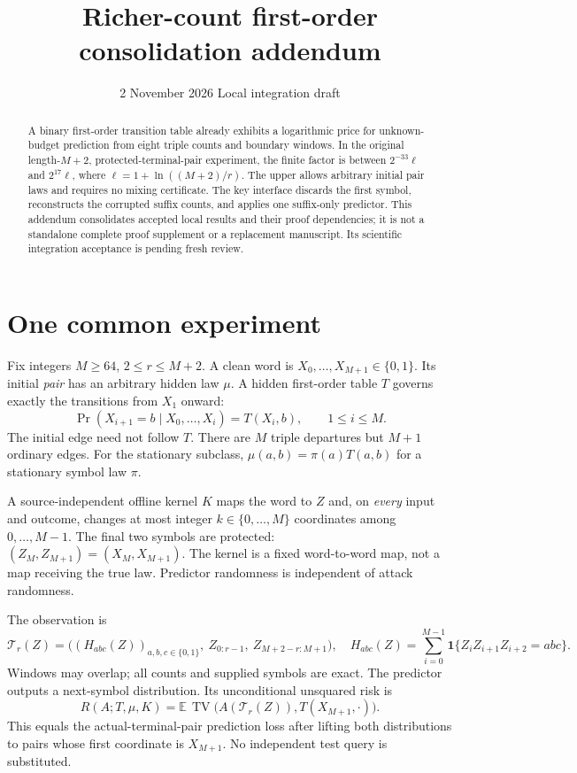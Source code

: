 \documentclass[10pt]{article}
\title{Richer-count first-order consolidation addendum}
\author{}
\date{2 November 2026 \quad Local integration draft}
\newcommand{\TV}{\operatorname{TV}}
\newcommand{\E}{\mathbb E}
\newcommand{\ind}{\mathbf1}
\begin{document}
\maketitle
\vspace{-1.3em}
\begin{abstract}
A binary first-order transition table already exhibits a logarithmic price for unknown-budget prediction from eight triple counts and boundary windows. In the original length-$M+2$, protected-terminal-pair experiment, the finite factor is between $2^{-33}\ell$ and $2^{17}\ell$, where $\ell=1+\ln((M+2)/r)$. The upper allows arbitrary initial pair laws and requires no mixing certificate. The key interface discards the first symbol, reconstructs the corrupted suffix counts, and applies one suffix-only predictor. This addendum consolidates accepted local results and their proof dependencies; it is not a standalone complete proof supplement or a replacement manuscript. Its scientific integration acceptance is pending fresh review.
\end{abstract}
\section{One common experiment}
Fix integers $M\ge64$, $2\le r\le M+2$. A clean word is $X_0,\ldots,X_{M+1}\in\{0,1\}$. Its initial \emph{pair} has an arbitrary hidden law $\mu$. A hidden first-order table $T$ governs exactly the transitions from $X_1$ onward:
\[
 \Pr(X_{i+1}=b\mid X_0,\ldots,X_i)=T(X_i,b),\qquad 1\le i\le M.
\]
The initial edge need not follow $T$. There are $M$ triple departures but $M+1$ ordinary edges. For the stationary subclass, $\mu(a,b)=\pi(a)T(a,b)$ for a stationary symbol law $\pi$.

A source-independent offline kernel $K$ maps the word to $Z$ and, on \emph{every} input and outcome, changes at most integer $k\in\{0,\ldots,M\}$ coordinates among $0,\ldots,M-1$. The final two symbols are protected: $(Z_M,Z_{M+1})=(X_M,X_{M+1})$. The kernel is a fixed word-to-word map, not a map receiving the true law. Predictor randomness is independent of attack randomness.

The observation is
\[
 \mathcal T_r(Z)=\big((H_{abc}(Z))_{a,b,c\in\{0,1\}},\ Z_{0:r-1},\ Z_{M+2-r:M+1}\big),
 \quad H_{abc}(Z)=\sum_{i=0}^{M-1}\ind\{Z_iZ_{i+1}Z_{i+2}=abc\}.
\]
Windows may overlap; all counts and supplied symbols are exact. The predictor outputs a next-symbol distribution. Its unconditional unsquared risk is
\[
 R(A;T,\mu,K)=\E\,\TV\big(A(\mathcal T_r(Z)),T(X_{M+1},\cdot)\big).
\]
This equals the actual-terminal-pair prediction loss after lifting both distributions to pairs whose first coordinate is $X_{M+1}$. No independent test query is substituted.
\end{document}
